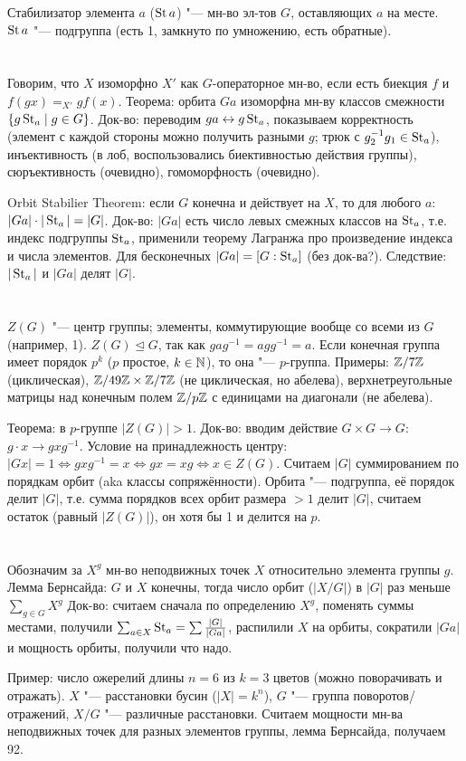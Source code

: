 Стабилизатор элемента $a$ ($\operatorname{St} a$) "--- мн-во эл-тов $G$, оставляющих $a$ на месте.
$\operatorname{St} a$ "--- подгруппа (есть 1, замкнуто по умножению, есть обратные).

\section{} %
Говорим, что $X$ изоморфно $X'$ как $G$-операторное мн-во, если
есть биекция $f$ и $f(gx)=_{X'}gf(x)$.
Теорема: орбита $Ga$ изоморфна мн-ву классов смежности $\{ g\operatorname{St}_a \mid g \in G \}$.
Док-во: переводим $ga \leftrightarrow g \operatorname{St}_a$, показываем корректность (элемент с каждой стороны можно получить
разными $g$; трюк с $g_2^{-1}g_1 \in \operatorname{St}_a$), инъективность (в лоб, воспользовались биективностью
действия группы), сюръективность (очевидно), гомоморфность (очевидно).

Orbit Stabilier Theorem: если $G$ конечна и действует на $X$, то для любого $a$:
$|Ga| \cdot |\operatorname{St}_a| = |G|$.
Док-во: $|Ga|$ есть число левых смежных классов на $\operatorname{St}_a$, т.е. индекс подгруппы $\operatorname{St}_a$,
применили теорему Лагранжа про произведение индекса и числа элементов.
Для бесконечных $|Ga|=[G:\operatorname{St}_a]$ (без док-ва?).
Следствие: $|\operatorname{St}_a|$ и $|Ga|$ делят $|G|$.

\section{} %
$Z(G)$ "--- центр группы; элементы, коммутирующие вообще со всеми из $G$ (например, 1).
$Z(G) \unlhd G$, так как $gag^{-1}=agg^{-1}=a$.
Если конечная группа имеет порядок $p^k$ ($p$ простое, $k\in \mathbb{N}$), то она "--- $p$-группа.
Примеры: $\mathbb{Z}/7\mathbb{Z}$ (циклическая), $\mathbb{Z}/49\mathbb{Z} \times \mathbb{Z}/7\mathbb{Z}$ (не циклическая, но абелева),
верхнетреугольные матрицы над конечным полем $\mathbb{Z}/p\mathbb{Z}$ с единицами на диагонали (не абелева).

Теорема: в $p$-группе $|Z(G)|>1$.
Док-во: вводим действие $G\times G \to G$: $g \cdot x \to gxg^{-1}$.
Условие на принадлежность центру: $|Gx|=1 \iff gxg^{-1} = x \iff gx = xg \iff x \in Z(G)$.
Считаем $|G|$ суммированием по порядкам орбит (aka классы сопряжённости).
Орбита "--- подгруппа, её порядок делит $|G|$, т.е. сумма
порядков всех орбит размера $>1$ делит $|G|$, считаем остаток (равный $|Z(G)|$), он хотя
бы 1 и делится на $p$.

\section{} %
Обозначим за $X^g$ мн-во неподвижных точек $X$ относительно элемента группы $g$.
Лемма Бернсайда: $G$ и $X$ конечны, тогда число орбит ($|X/G|$) в $|G|$ раз меньше $\sum_{g \in G} X^g$
Док-во: считаем сначала по определению $X^g$, поменять суммы местами,
получили $\sum_{a\in X} \operatorname{St}_a=\sum \frac{|G|}{|Ga|}$, распилили $X$ на орбиты,
сократили $|Ga|$ и мощность орбиты, получили что надо.

Пример: число ожерелий длины $n=6$ из $k=3$ цветов (можно поворачивать и отражать).
$X$ "--- расстановки бусин ($|X|=k^n$), $G$ "--- группа поворотов/отражений, $X/G$ "--- различные
расстановки.
Считаем мощности мн-ва неподвижных точек для разных элементов группы, лемма Бернсайда,
получаем 92.

